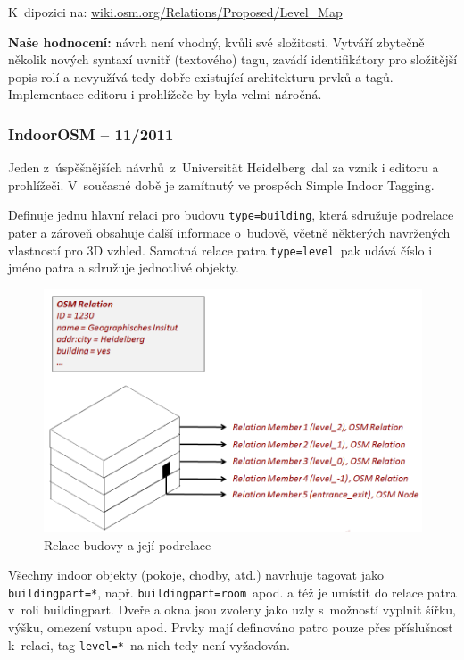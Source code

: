 K~dipozici na: \href{http://wiki.osm.org/Relations/Proposed/Level\_Map}{wiki.osm.org/Relations/Proposed/Level\_Map}

\textbf{Naše hodnocení:} návrh není vhodný, kvůli své složitosti. Vytváří zbytečně několik nových syntaxí uvnitř (textového) tagu, zavádí identifikátory pro složitější popis rolí a nevyužívá tedy dobře existující architekturu prvků a tagů. Implementace editoru i prohlížeče by byla velmi náročná.

\subsubsection{IndoorOSM -- 11/2011}\label{indoorosm-112011}

Jeden z~úspěšnějších návrhů~z~Universität Heidelberg\cite{zdroj48}~dal za vznik i editoru a prohlížeči. V~současné době je zamítnutý ve prospěch Simple Indoor Tagging.

Definuje jednu hlavní relaci pro budovu \texttt{type=building}, která sdružuje podrelace pater a zároveň obsahuje další informace o~budově, včetně některých navržených vlastností pro 3D vzhled. Samotná relace patra \texttt{type=level}~pak udává číslo i jméno patra a sdružuje jednotlivé objekty.

 \begin{figure}
	  \centering
      \includegraphics[width=\textwidth]{img/27-IndoorOSM-General.png}
      \caption{Relace budovy a její podrelace\cite{zdroj49}}
      \label{obr27}
  \end{figure}

Všechny indoor objekty (pokoje, chodby, atd.) navrhuje tagovat jako \\ \texttt{buildingpart=*}, např. \texttt{buildingpart=room}~apod. a též je umístit do relace patra v~roli buildingpart. Dveře a okna jsou zvoleny jako uzly s~možností vyplnit šířku, výšku, omezení vstupu apod. Prvky mají definováno patro pouze přes příslušnost k~relaci, tag \texttt{level=*}~na nich tedy není vyžadován.

